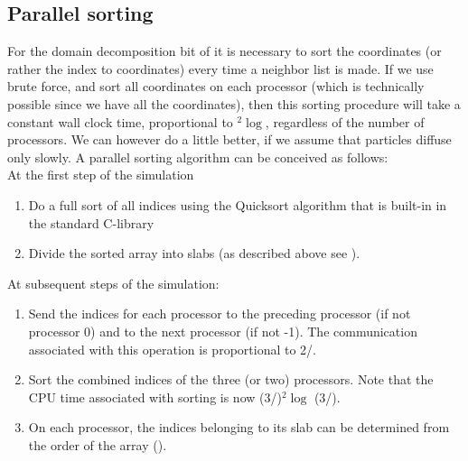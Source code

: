 \subsection{Parallel sorting}
\label{sec:parsort}
For the domain decomposition bit of {\gromacs} it is necessary to sort the 
coordinates (or rather the index to coordinates) every time a neighbor list is made.
If we use brute force, and sort all coordinates on each processor (which is 
technically possible since we have all the coordinates), then this sorting procedure
will take a constant wall clock time, proportional to {\natom}$^2\log${\natom}, 
regardless of the number of processors. We can however do a little
better, if we assume that particles diffuse only slowly.
A parallel sorting algorithm can be conceived as follows: \\
At the first step of the simulation
\begin{enumerate}
\item   Do a full sort of all indices using {\eg} the  Quicksort algorithm that is
        built-in in the standard C-library
\item   Divide the sorted array into slabs (as described above see 
        ).
\end{enumerate}
At subsequent steps of the simulation:
\begin{enumerate}
\item   Send the indices for each processor to the preceding processor (if
        not processor 0) and to the next processor (if not {\nproc}-1). The 
        communication associated with this operation is proportional to
        2{\natom}/{\nproc}.
\item   Sort the combined indices of the three (or two) processors. Note that
        the CPU time associated with sorting is now
        (3{\natom}/{\nproc})$^2\log$ (3{\natom}/{\nproc}).
\item   On each processor, the indices belonging to its slab can be determined
        from the order of the array ().
\end{enumerate}



